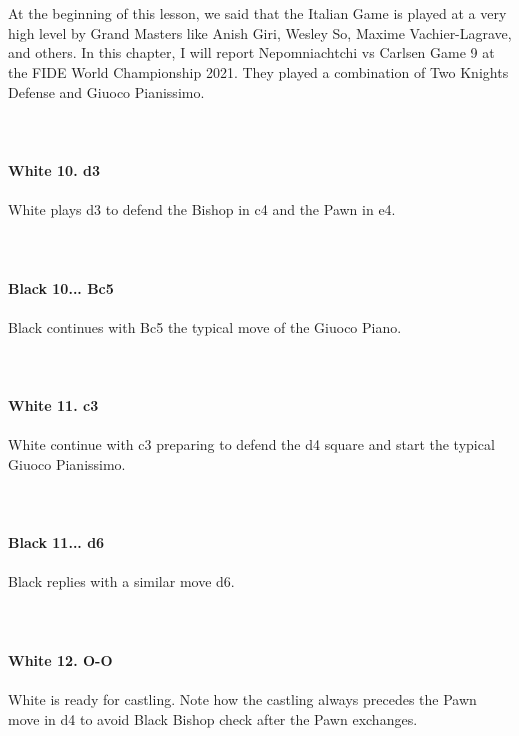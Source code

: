 \documentclass{article}
\begin{document}

\\
\\
At the beginning of this lesson, we said that the Italian Game is played at a very high level by Grand Masters like Anish Giri, Wesley So, Maxime Vachier-Lagrave, and others. In this chapter, I will report Nepomniachtchi vs Carlsen Game 9 at the FIDE World Championship 2021. They played a combination of Two Knights Defense and Giuoco Pianissimo.\\
\\

\\
\\
\textbf{White 10. d3}\\
\\
White plays d3 to defend the Bishop in c4 and the Pawn in e4.\\
\\

\\
\\
\textbf{Black 10... Bc5}\\
\\
Black continues with Bc5 the typical move of the Giuoco Piano.\\
\\

\\
\\
\textbf{White 11. c3}\\
\\
White continue with c3 preparing to defend the d4 square and start the typical Giuoco Pianissimo.\\
\\

\\
\\
\textbf{Black 11... d6}\\
\\
Black replies with a similar move d6.\\
\\

\\
\\
\textbf{White 12. O-O}\\
\\
White is ready for castling. Note how the castling always precedes the Pawn move in d4 to avoid Black Bishop check after the Pawn exchanges.\\
\end{document}
